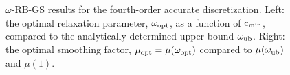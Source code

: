 \documentclass{article}
\begin{document}
{
\renewcommand{\figWidth}{7.cm}
\newcommand{\trimfig}[2]{\trimhb{#1}{#2}{.0}{.0}{.0}{.0}}
\begin{figure}[hbt]
\begin{center}
\end{center}
\caption{$\omega$-RB-GS results for the fourth-order accurate discretization.
Left: the optimal relaxation parameter, $\omega_{\rm opt}$, as a function of ${\rm c}_{\rm min}$,
compared to the analytically determined upper bound $\omega_{\rm ub}$. Right: the optimal smoothing
factor, $\mu_{\rm opt}=\mu(\omega_{\rm opt})$ compared to $\mu(\omega_{\rm ub})$ and $\mu(1)$. }
\label{fig:redBlack4}
\end{figure}
}

\end{document}
